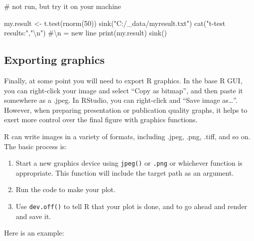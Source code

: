 \documentclass[
  13,
  letterpaper,
]{report}
\newenvironment{Shaded}{\begin{snugshade}}{\end{snugshade}}
\newcommand{\CommentTok}[1]{\textcolor[rgb]{0.37,0.37,0.37}{#1}}
\newcommand{\DecValTok}[1]{\textcolor[rgb]{0.68,0.00,0.00}{#1}}
\newcommand{\FunctionTok}[1]{\textcolor[rgb]{0.28,0.35,0.67}{#1}}
\newcommand{\NormalTok}[1]{\textcolor[rgb]{0.00,0.23,0.31}{#1}}
\newcommand{\OtherTok}[1]{\textcolor[rgb]{0.00,0.23,0.31}{#1}}
\newcommand{\SpecialCharTok}[1]{\textcolor[rgb]{0.37,0.37,0.37}{#1}}
\newcommand{\StringTok}[1]{\textcolor[rgb]{0.13,0.47,0.30}{#1}}
\providecommand{\tightlist}{%
  \setlength{\itemsep}{0pt}\setlength{\parskip}{0pt}}
\begin{document}
\begin{Shaded}
\begin{Highlighting}[]
\CommentTok{\# not run, but try it on your machine}

\NormalTok{my.result }\OtherTok{\textless{}{-}} \FunctionTok{t.test}\NormalTok{(}\FunctionTok{rnorm}\NormalTok{(}\DecValTok{50}\NormalTok{))}
\FunctionTok{sink}\NormalTok{(}\StringTok{"C:/\_data/myresult.txt"}\NormalTok{)}
\FunctionTok{cat}\NormalTok{(}\StringTok{"t{-}test results:"}\NormalTok{,}\StringTok{"}\SpecialCharTok{\textbackslash{}n}\StringTok{"}\NormalTok{) }\CommentTok{\#\textbackslash{}n = new line}
\FunctionTok{print}\NormalTok{(my.result)}
\FunctionTok{sink}\NormalTok{()}
\end{Highlighting}
\end{Shaded}

\subsection{Exporting graphics}\label{sec-ie-export-graphics}

Finally, at some point you will need to export R graphics. In the base R
GUI, you can right-click your image and select ``Copy as bitmap'', and
then paste it somewhere as a .jpeg. In RStudio, you can right-click and
``Save image as\ldots{}''. However, when preparing presentation or
publication quality graphs, it helps to exert more control over the
final figure with graphics functions.

R can write images in a variety of formats, including .jpeg, .png,
.tiff, and so on. The basic process is:

\begin{enumerate}
\def\labelenumi{\arabic{enumi}.}
\tightlist
\item
  Start a new graphics device using \texttt{jpeg()} or \texttt{.png} or
  whichever function is appropriate. This function will include the
  target path as an argument.
\item
  Run the code to make your plot.
\item
  Use \texttt{dev.off()} to tell R that your plot is done, and to go
  ahead and render and save it.
\end{enumerate}

Here is an example:
\end{document}
